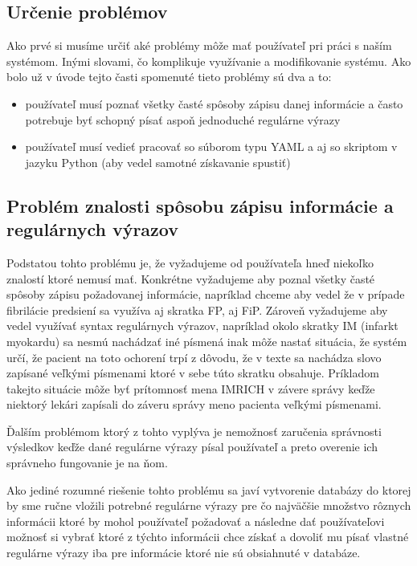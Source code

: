 \subsection{Určenie problémov}

Ako prvé si musíme určiť aké problémy môže mať používateľ pri práci s naším systémom. Inými slovami, čo komplikuje využívanie a modifikovanie systému. Ako bolo už v úvode tejto časti spomenuté tieto problémy sú dva a to:

\begin{itemize}
	\item používateľ musí poznať všetky časté spôsoby zápisu danej informácie a často potrebuje byť schopný písať aspoň jednoduché regulárne výrazy
	\item používateľ musí vedieť pracovať so súborom typu YAML a aj so skriptom v jazyku Python (aby vedel samotné získavanie spustiť)
\end{itemize}

\subsection{Problém znalosti spôsobu zápisu informácie a regulárnych výrazov}

Podstatou tohto problému je, že vyžadujeme od používateľa hneď niekoľko znalostí ktoré nemusí mať. Konkrétne vyžadujeme aby poznal všetky časté spôsoby zápisu požadovanej informácie, napríklad chceme aby vedel že v prípade fibrilácie predsiení sa využíva aj skratka FP, aj FiP. Zároveň vyžadujeme aby vedel využívať syntax regulárnych výrazov, napríklad okolo skratky IM (infarkt myokardu) sa nesmú nachádzať iné písmená inak môže nastať situácia, že systém určí, že pacient na toto ochorení trpí z dôvodu, že v texte sa nachádza slovo zapísané veľkými písmenami ktoré v sebe túto skratku obsahuje. Príkladom takejto situácie môže byť prítomnosť mena IMRICH v závere správy keďže niektorý lekári zapísali do záveru správy meno pacienta veľkými písmenami. 

Ďalším problémom ktorý z tohto vyplýva je nemožnosť zaručenia správnosti výsledkov keďže dané regulárne výrazy písal používateľ a preto overenie ich správneho fungovanie je na ňom. 

Ako jediné rozumné riešenie tohto problému sa javí vytvorenie databázy do ktorej by sme ručne vložili potrebné regulárne výrazy pre čo najväčšie množstvo rôznych informácii ktoré by mohol používateľ požadovať a následne dať používateľovi možnosť si vybrať ktoré z týchto informácii chce získať a dovoliť mu písať vlastné regulárne výrazy iba pre informácie ktoré nie sú obsiahnuté v databáze.

